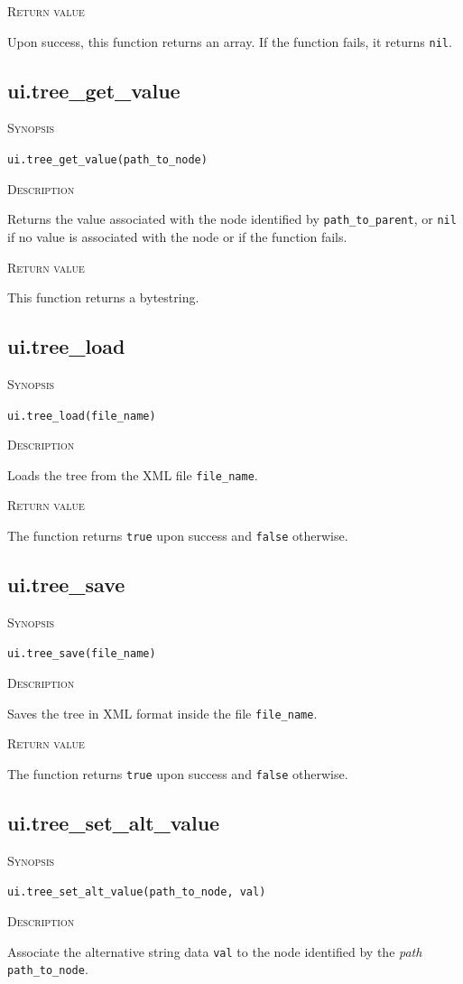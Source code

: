 \documentclass[11pt]{report}
\newcommand{\mansection}[1]{\vspace{0.5em}\par\noindent\textsc{#1}\vspace{0.5em}\par}
\newcommand{\syn}[1]{\texttt{#1}}
\begin{document}
\mansection{Return value}
  Upon success, this function returns an array.
  If the function fails, it returns \syn{nil}.


\subsection{ui.tree\_get\_value}

\mansection{Synopsis}
\syn{ui.tree\_get\_value(path\_to\_node)}

\mansection{Description}
  Returns the value associated with the node identified by \syn{path\_to\_parent}, 
  or \syn{nil} if no value is associated with the node or if the function fails.

\mansection{Return value}
  This function returns a bytestring.
 

\subsection{ui.tree\_load}

\mansection{Synopsis}
\syn{ui.tree\_load(file\_name)}

\mansection{Description}
  Loads the tree from the XML file \syn{file\_name}.

\mansection{Return value}
  The function returns \syn{true} upon success and \syn{false} otherwise.


\subsection{ui.tree\_save}

\mansection{Synopsis}
\syn{ui.tree\_save(file\_name)}

\mansection{Description}
  Saves the tree in XML format inside the file \syn{file\_name}.

\mansection{Return value}
  The function returns \syn{true} upon success and \syn{false} otherwise.


\subsection{ui.tree\_set\_alt\_value}

\mansection{Synopsis}
\syn{ui.tree\_set\_alt\_value(path\_to\_node, val)}

\mansection{Description}
  Associate the alternative string data \syn{val} to the node identified by the \emph{path} 
  \syn{path\_to\_node}. 
\end{document}

